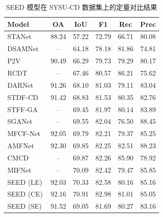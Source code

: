 \begin{table}[!htbp]
\centering
\caption{SEED 模型在 SYSU-CD 数据集上的定量对比结果}
\label{tab:seed_sysu}
\begin{tabular}{lccccc}
\hline
\textbf{Model} & \textbf{OA} & \textbf{IoU} & \textbf{F1} & \textbf{Rec} & \textbf{Prec} \\
\hline
STANet~\cite{chen_spatial-temporal_2020} & 88.24 & 57.22 & 72.79 & 66.71 & 80.08 \\
DSAMNet~\cite{shi_deeply_2022}    & --    & 64.18 & 78.18 & 81.86 & 74.81 \\
P2V~\cite{lin_transition_2023}    & 90.49 & 66.29 & 79.73 & 79.29 & 80.17 \\
RCDT~\cite{lu_cross_2024}         & --    & 67.46 & 80.57 & 86.21 & 75.62 \\
DARNet~\cite{li_densely_2022}     & 91.26 & 68.10 & 81.03 & 79.11 & 83.04 \\
STDF-CD~\cite{y_zhou_stdf_2025}   & 91.42 & 68.83 & 81.53 & 80.35 & 82.76 \\
STFF-GA~\cite{h_wei_spatio-temporal_2024}   & --  & 69.45   & 81.97  & 80.14  & 83.89 \\
SGANet~\cite{j_chen_sganet_2025}  & --    & 69.55 & 82.04 & 76.50 & 88.45 \\
MFCF-Net~\cite{b_huang_remote-sensing_2024}   & 92.05   & 69.79   & 82.21   & 79.37   & 85.25 \\
AMFNet~\cite{zhan_amfnet_2024}     & 92.30  & 69.85 &  82.25 &  82.51 &  88.23 \\
CMCD~\cite{li_cmcd_2025}          & --    & 69.87 & 82.26 & 85.90 & 78.92 \\
MIFNet~\cite{w_xie_mifnet_2025}       & --  & 70.09 & 82.42 & 79.47 & 85.85 \\
\hline
SEED (LE)                             & 92.03 & 70.33 & 82.58 & 80.16 & 85.16 \\
SEED (CE) & 92.16 & 70.91	& 82.98	& 81.01	& 85.05 \\
SEED (SE) & 91.52 & 69.05	& 81.69	& 80.27	& 83.16 \\
\hline
\end{tabular}
\end{table}



